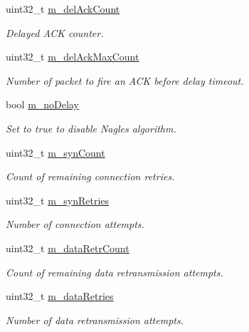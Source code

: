 \begin{DoxyCompactItemize}
uint32\+\_\+t \hyperlink{classns3_1_1TcpSocketBase_a7652a3f675c8d56bd5ddc868da70153e}{m\+\_\+del\+Ack\+Count}
\begin{DoxyCompactList}\small\item\em Delayed A\+CK counter. \end{DoxyCompactList}\item 
uint32\+\_\+t \hyperlink{classns3_1_1TcpSocketBase_a8a36367ad1e6e7e70827e4c4ba746240}{m\+\_\+del\+Ack\+Max\+Count}
\begin{DoxyCompactList}\small\item\em Number of packet to fire an A\+CK before delay timeout. \end{DoxyCompactList}\item 
bool \hyperlink{classns3_1_1TcpSocketBase_ad358f0bbed41f6b13d474c49db493223}{m\+\_\+no\+Delay}
\begin{DoxyCompactList}\small\item\em Set to true to disable Nagle\textquotesingle{}s algorithm. \end{DoxyCompactList}\item 
uint32\+\_\+t \hyperlink{classns3_1_1TcpSocketBase_addf20037951e7b85435a97d8885ea844}{m\+\_\+syn\+Count}
\begin{DoxyCompactList}\small\item\em Count of remaining connection retries. \end{DoxyCompactList}\item 
uint32\+\_\+t \hyperlink{classns3_1_1TcpSocketBase_ac1995a7d30c5175e8f2db539ff288d0f}{m\+\_\+syn\+Retries}
\begin{DoxyCompactList}\small\item\em Number of connection attempts. \end{DoxyCompactList}\item 
uint32\+\_\+t \hyperlink{classns3_1_1TcpSocketBase_ace7efd32ba5d109037ddd08e128d589d}{m\+\_\+data\+Retr\+Count}
\begin{DoxyCompactList}\small\item\em Count of remaining data retransmission attempts. \end{DoxyCompactList}\item 
uint32\+\_\+t \hyperlink{classns3_1_1TcpSocketBase_a65d99ef317bd43d9f8a58a34c8fe5faa}{m\+\_\+data\+Retries}
\begin{DoxyCompactList}\small\item\em Number of data retransmission attempts. \end{DoxyCompactList}\item 

\end{DoxyCompactItemize}
